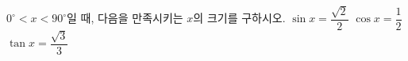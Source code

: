$0^\circ<x<90^\circ$일 때, 다음을 만족시키는 $x$의 크기를 구하시오.
 $\sin x=\dfrac{\sqrt{2}}{2}$
 $\cos x=\dfrac{1}{2}$
 $\tan x=\dfrac{\sqrt{3}}{3}$
